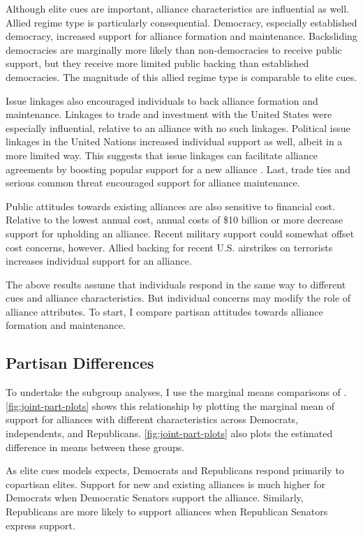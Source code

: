 \documentclass[12pt]{article}
\begin{document}
Although elite cues are important, alliance characteristics are influential as well. 
Allied regime type is particularly consequential. 
Democracy, especially established democracy, increased support for alliance formation and maintenance.  
Backsliding democracies are marginally more likely than non-democracies to receive public support, but they receive more limited public backing than established democracies.
The magnitude of this allied regime type is comparable to elite cues. 


Issue linkages also encouraged individuals to back alliance formation and maintenance. 
Linkages to trade and investment with the United States were especially influential, relative to an alliance with no such linkages. 
Political issue linkages in the United Nations increased individual support as well, albeit in a more limited way. 
This suggests that issue linkages can facilitate alliance agreements by boosting popular support for a new alliance \citep{Poast2012}. 
Last, trade ties and serious common threat encouraged support for alliance maintenance. 
 

Public attitudes towards existing alliances are also sensitive to financial cost.
Relative to the lowest annual cost, annual costs of \$10 billion or more decrease support for upholding an alliance.  
Recent military support could somewhat offset cost concerns, however. 
Allied backing for recent U.S. airstrikes on terrorists increases individual support for an alliance. 


The above results assume that individuals respond in the same way to different cues and alliance characteristics. 
But individual concerns may modify the role of alliance attributes.
To start, I compare partisan attitudes towards alliance formation and maintenance. 



\subsection{Partisan Differences}


To undertake the subgroup analyses, I use the marginal means comparisons of \citet{Leeperetal2020}. 
\autoref{fig:joint-part-plots} shows this relationship by plotting the marginal mean of support for alliances with different characteristics across Democrats, independents, and Republicans. 
\autoref{fig:joint-part-plots} also plots the estimated difference in means between these groups. 


As elite cues models expects, Democrats and Republicans respond primarily to copartisan elites.
Support for new and existing alliances is much higher for Democrats when Democratic Senators support the alliance.
Similarly, Republicans are more likely to support alliances when Republican Senators express support.
\end{document}
